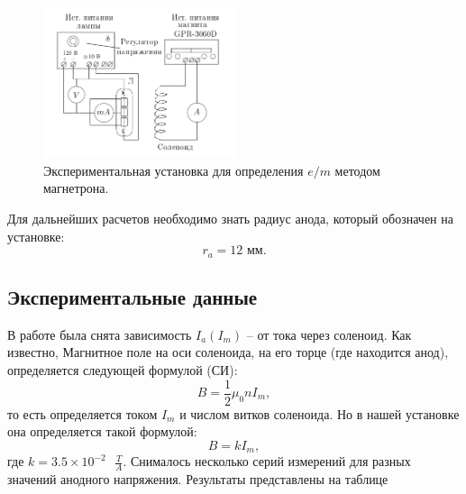 \documentclass[a4paper, 14pt]{extarticle}%
\newcommand\ECaption[1]{%
     \captionsetup{font=footnotesize}%
     \caption{#1}}
\begin{document}
\begin{figure}[h!]
\begin{center}
\includegraphics[width=0.5\textwidth]{ustB}
\end{center}
\ECaption{Экспериментальная установка для определения $e/m$ методом магнетрона.}
\end{figure}
Для дальнейших расчетов необходимо знать радиус анода, который обозначен на установке:
\[r_a = 12 \text{ мм}.\]

\subsection*{Экспериментальные данные}

В работе была снята зависимость $I_a(I_m)$ -- от тока через соленоид. Как известно, Магнитное поле на оси соленоида, на его торце (где находится анод), определяется следующей формулой (СИ):
\begin{equation}
B = \frac{1}{2}\mu_0nI_m,
\end{equation}
то есть определяется током $I_m$ и числом витков соленоида. Но в нашей установке она определяется такой формулой:
\begin{equation}
B = kI_m,
\end{equation}
где $k = 3.5\times 10^{-2} \text{ } \frac{T}{A}$.
Снималось несколько серий измерений для разных значений анодного напряжения. Результаты представлены на таблице
\end{document}
